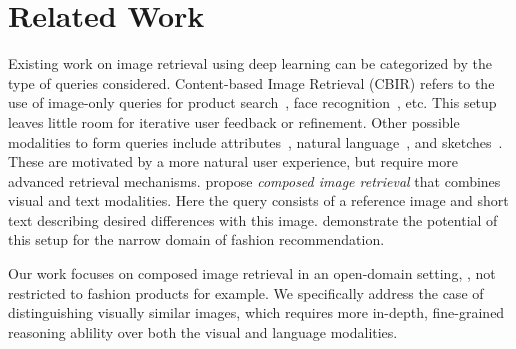\documentclass[10pt,twocolumn,letterpaper]{article}
\makeatletter
\renewcommand{\paragraph}{\@startsection{paragraph}{4}{\z@}{1.05ex \@plus 1ex \@minus .2ex}{-1em}{\normalfont\normalsize\bfseries}}
\makeatother
\begin{document}
\section{Related Work}\label{sec:related_work}

\paragraph{Image retrieval.}
Existing work on image retrieval using deep learning can be categorized by the type of queries considered.
Content-based Image Retrieval (CBIR) refers to the use of image-only queries for product search~\cite{liuLQWTcvpr16DeepFashion}, face recognition~\cite{schroff2015facenet,masi2018deep}, etc.
This setup leaves little room for iterative user feedback or refinement.
Other possible modalities to form queries include attributes~\cite{han2017automatic_fashion200k}, natural language~\cite{6126478_tbir,zhang_tbir}, and sketches~\cite{radenovic2018deep}.
These are motivated by a more natural user experience, but require more advanced retrieval mechanisms.
\citet{Vo_2019_tirg} propose \emph{composed image retrieval} that combines visual and text modalities.
Here the query consists of a reference image and short text describing desired differences with this image.
\citet{fashioniq} demonstrate the potential of this setup for the narrow domain of fashion recommendation.

Our work focuses on composed image retrieval in an open-domain setting, \ie, not restricted to fashion products for example. We specifically address the case of distinguishing visually similar images, which requires more in-depth, fine-grained reasoning ablility over both the visual and language modalities.
\end{document}
